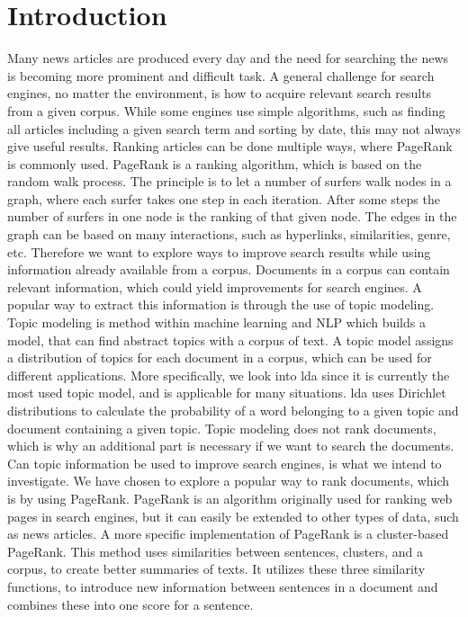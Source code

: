 \section{Introduction} 

Many news articles are produced every day and the need for searching the news is becoming more prominent and difficult task.
A general challenge for search engines, no matter the environment, is how to acquire relevant search results from a given corpus. 
While some engines use simple algorithms, such as finding all articles including a given search term and sorting by date, this may not always give useful results.
Ranking articles can be done multiple ways, where PageRank is commonly used\cite{google_pagerank2006}.
PageRank\cite{pagerank_1999} is a ranking algorithm, which is based on the random walk process.
The principle is to let a number of surfers walk nodes in a graph, where each surfer takes one step in each iteration.
After some steps the number of surfers in one node is the ranking of that given node.
The edges in the graph can be based on many interactions, such as hyperlinks, similarities, genre, etc.
Therefore we want to explore ways to improve search results while using information already available from a corpus.
Documents in a corpus can contain relevant information, which could yield improvements for search engines.
A popular way to extract this information is through the use of topic modeling.
Topic modeling is method within machine learning and \gls{NLP} which builds a model, that can find abstract topics with a corpus of text.
A topic model assigns a distribution of topics for each document in a corpus, which can be used for different applications.
More specifically, we look into \gls{lda} since it is currently the most used topic model, and is applicable for many situations\cite{lda}.
\gls{lda} uses Dirichlet distributions to calculate the probability of a word belonging to a given topic and document containing a given topic.
Topic modeling does not rank documents, which is why an additional part is necessary if we want to search the documents.
Can topic information be used to improve search engines, is what we intend to investigate.
We have chosen to explore a popular way to rank documents, which is by using PageRank.
PageRank is an algorithm originally used for ranking web pages in search engines, but it can easily be extended to other types of data, such as news articles.
A more specific implementation of PageRank is a cluster-based PageRank\cite{ClusterPageRank}.
This method uses similarities between sentences, clusters, and a corpus, to create better summaries of texts.
It utilizes these three similarity functions, to introduce new information between sentences in a document and combines these into one score for a sentence.


